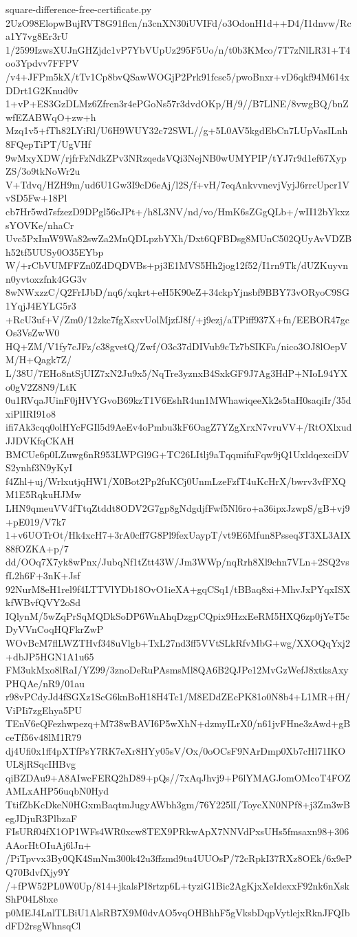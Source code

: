 \documentclass[11pt]{article}
\theoremstyle{definition}
\theoremstyle{remark}
\begin{document}
\begin{filecontents*}[overwrite]{square-difference-free-certificate.py}
2UzO98ElopwBujRVT8G91flcn/n3cnXN30iUVIFd/o3OdonH1d++D4/I1dnvw/Rca1Y7vg8Er3rU
1/2599IzwsXUJnGHZjdc1vP7YbVUpUz295F5Uo/n/t0b3KMco/7T7zNlLR31+T4oo3Ypdvv7FFPV
/v4+JFPm5kX/tTv1Cp8bvQSawWOGjP2Prk91fcsc5/pwoBnxr+vD6qkf94M614xDDrt1G2Knud0v
1+vP+ES3GzDLMz6Zfrcn3r4ePGoNs57r3dvdOKp/H/9//B7LlNE/8vwgBQ/bnZwfEZABWqO+zw+h
Mzq1v5+fTh82LYiRl/U6H9WUY32c72SWL//g+5L0AV5kgdEbCn7LUpVasILnh8FQepTiPT/UgVHf
9wMxyXDW/rjfrFzNdkZPv3NRzqedsVQi3NejNB0wUMYPIP/tYJ7r9d1ef67XypZS/3o9tkNoWr2u
V+Tdvq/HZH9m/ud6U1Gw3I9cD6eAj/l2S/f+vH/7eqAnkvvnevjVyjJ6rrcUpcr1VvSD5Fw+18Pl
cb7Hr5wd7sfzezD9DPgl56cJPt+/h8L3NV/nd/vo/HmK6sZGgQLb+/wII12bYkxzsYOVKe/nhaCr
Uvc5PxImW9Wa82swZa2MnQDLpzbYXh/Dxt6QFBDsg8MUnC502QUyAvVDZBh52tf5UUSy0O35EYbp
W/+rCbVUMFFZn0ZdDQDVBs+pj3E1MVS5Hh2jog12f52/I1rn9Tk/dUZKuyvnn0yvtoxzfnk4GG3v
8wNWxzzC/Q2FrIJbD/nq6/xqkrt+eH5K90eZ+34ckpYjnsbf9BBY73vORyoC9SG1YqjJ4EYLG5r3
+RcU3uf+V/Zm0/12zkc7fgXsxvUolMjzfJ8f/+j9ezj/aTPiff937X+fn/EEBOR47gcOs3VsZwW0
HQ+ZM/V1fy7cJFz/c38gvetQ/Zwf/O3c37dDIVub9cTz7bSIKFa/nico3OJ8lOepVM/H+Qagk7Z/
L/38U/7EHo8ntSjUIZ7xN2Ju9x5/NqTre3yznxB4SxkGF9J7Ag3HdP+NIoL94YXo0gV2Z8N9/LtK
0u1RVqaJUinF0jHVYGvoB69kzT1V6EshR4un1MWhawiqeeXk2s5taH0saqiIr/35dxiPlIRI91o8
ifi7Ak3cqq0olHYcFGIl5d9AeEv4oPmbu3kF6OagZ7YZgXrxN7vruVV+/RtOXlxudJJDVKfqCKAH
BMCUe6p0LZuwg6nR953LWPGl9G+TC26LItlj9aTqqmifuFqw9jQ1UxldqexciDVS2ynhf3N9yKyI
f4Zhl+uj/WrlxutjqHW1/X0Bot2Pp2fuKCj0UnmLzeFzfT4uKcHrX/bwrv3vfFXQM1E5RqkuHJMw
LHN9qmeuVV4fTtqZtddt8ODV2G7gp8gNdgdjfFwf5Nl6ro+a36ipxJzwpS/gB+vj9+pE019/V7k7
1+v6UOTrOt/Hk4xcH7+3rA0cff7G8Pl9fexUaypT/vt9E6Mfun8Psseq3T3XL3AIX88fOZKA+p/7
dd/OOq7X7yk8wPnx/JubqNf1tZtt43W/Jm3WWp/nqRrh8Xl9chn7VLn+2SQ2vsfL2h6F+3nK+Jsf
92NurM8eH1rel9f4LTTVlYDb18OvO1ieXA+gqCSq1/tBBaq8xi+MhvJxPYqxISXkfWBvfQVY2oSd
IQlynM/5wZqPrSqMQDkSoDP6WnAhqDzgpCQpix9HzxEeRM5HXQ6zp0jYeT5cDyVVnCoqHQFkrZwP
WOvBcM7flLWZTHvf348uVlgb+TxL27nd3ff5VVtSLkRfvMbG+wg/XXOQqYxj2+dbJP5HGN1A1u65
FM3ukMxo8lRaI/YZ99/3znoDeRuPAsmsMl8QA6B2QJPe12MvGzWefJ8xtksAxyPHQAe/nR9/01au
r98vPCdyJd4fSGXz1ScG6knBoH18H4Tc1/M8EDdZEcPK81o0N8b4+L1MR+fH/ViPIi7zgEhya5PU
TEnV6eQFezhwpezq+M738wBAVI6P5wXhN+dzmyILrX0/n61jvFHne3zAwd+gBceTf56v48lM1R79
dj4Ufi0x1ff4pXTfPsY7RK7eXr8HYy05sV/Ox/0oOCsF9NArDmp0Xb7cHl71IKOUL8jRSqcIHBvg
qiBZDAu9+A8AIwcFERQ2hD89+pQs//7xAqJhvj9+P6lYMAGJomOMcoT4FOZAMLxAHP56uqbN0Hyd
TtifZbKcDkeN0HGxmBaqtmJugyAWbh3gm/76Y225lI/ToycXN0NPf8+j3Zm3wBegJDjuR3PlbzaF
FIsURf04fX1OP1WFs4WR0xcw8TEX9PRkwApX7NNVdPxsUHs5fmsaxn98+306AAorHtOIuAj6lJn+
/PiTpvvx3By0QK4SmNm300k42u3ffzmd9tu4UUOsP/72cRpkI37RXz8OEk/6x9ePQ70BdvfXjy9Y
/+fPW52PL0W0Up/814+jkalsPI8rtzp6L+tyziG1Bic2AgKjxXeIdexxF92nk6nXskShP04L8bxe
p0MEJ4LnlTLBiU1AlsRB7X9M0dvAO5vqOHBhhF5gVksbDqpVytlejxRknJFQIbdFD2rsgWhnsqCl

\end{filecontents*}
\end{document}
